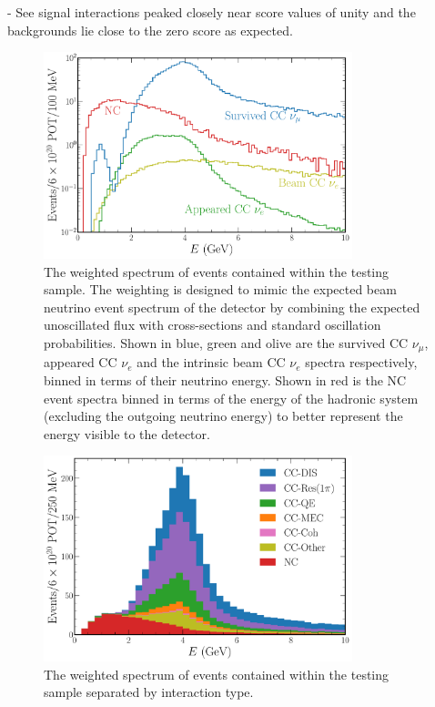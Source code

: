 - See signal interactions peaked closely near score values of unity and the backgrounds lie close
to the zero score as expected.

\begin{figure} %
    \includegraphics[width=0.8\textwidth]{diagrams/6-cvn/chipsnet/explore_osc_fluxes.pdf}
    \caption[Weighted spectrum of testing sample events.]
    {The weighted spectrum of events contained within the testing sample. The weighting is
        designed to mimic the expected beam neutrino event spectrum of the \chips detector by
        combining the expected unoscillated flux with cross-sections and standard oscillation
        probabilities. Shown in blue, green and olive are the survived CC $\nu_{\mu}$, appeared CC
        $\nu_{e}$ and the intrinsic beam CC $\nu_{e}$ spectra respectively, binned in terms of
        their neutrino energy. Shown in red is the NC event spectra binned in terms of the energy
        of the hadronic system (excluding the outgoing neutrino energy) to better represent the
        energy visible to the detector.}
    \label{fig:explore_osc_fluxes}
\end{figure}

\begin{figure} %
    \includegraphics[width=0.8\textwidth]{diagrams/6-cvn/chipsnet/explore_stacked_int_types.pdf}
    \caption[Weighted spectrum of interaction types within the testing sample.]
    {The weighted spectrum of events contained within the testing sample separated by interaction type.}
    \label{fig:explore_stacked_int_types}
\end{figure}


